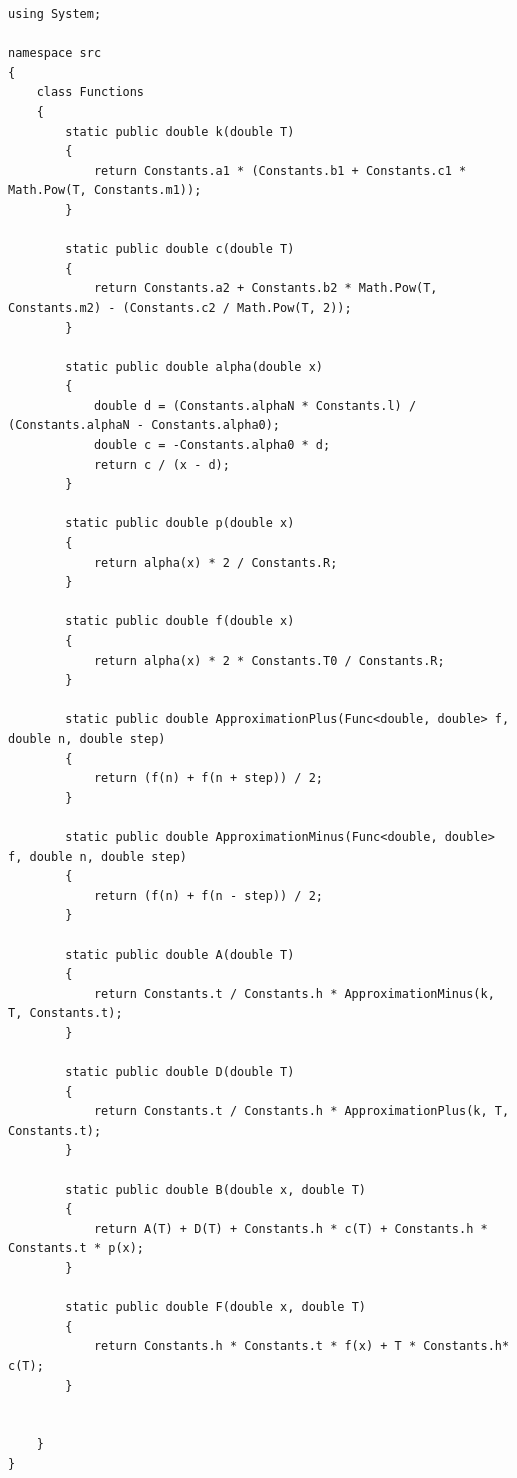 \documentclass[a4paper,oneside,12pt]{extreport}
\begin{document}
\begin{lstlisting}[]
using System;

namespace src
{
	class Functions
	{
		static public double k(double T)
		{
			return Constants.a1 * (Constants.b1 + Constants.c1 * Math.Pow(T, Constants.m1));
		}

		static public double c(double T)
		{
			return Constants.a2 + Constants.b2 * Math.Pow(T, Constants.m2) - (Constants.c2 / Math.Pow(T, 2));
		}
		
		static public double alpha(double x)
		{
			double d = (Constants.alphaN * Constants.l) / (Constants.alphaN - Constants.alpha0);
			double c = -Constants.alpha0 * d;
			return c / (x - d);
		}

		static public double p(double x)
		{
			return alpha(x) * 2 / Constants.R;
		}

		static public double f(double x)
		{
			return alpha(x) * 2 * Constants.T0 / Constants.R;
		}

		static public double ApproximationPlus(Func<double, double> f, double n, double step)
		{
			return (f(n) + f(n + step)) / 2;
		}

		static public double ApproximationMinus(Func<double, double> f, double n, double step)
		{
			return (f(n) + f(n - step)) / 2;
		}

		static public double A(double T)
		{
			return Constants.t / Constants.h * ApproximationMinus(k, T, Constants.t);
		}

		static public double D(double T)
		{
			return Constants.t / Constants.h * ApproximationPlus(k, T, Constants.t);
		}

		static public double B(double x, double T)
		{
			return A(T) + D(T) + Constants.h * c(T) + Constants.h * Constants.t * p(x);
		}

		static public double F(double x, double T)
		{
			return Constants.h * Constants.t * f(x) + T * Constants.h* c(T);
		}


	}
}
\end{lstlisting}
\end{document}
